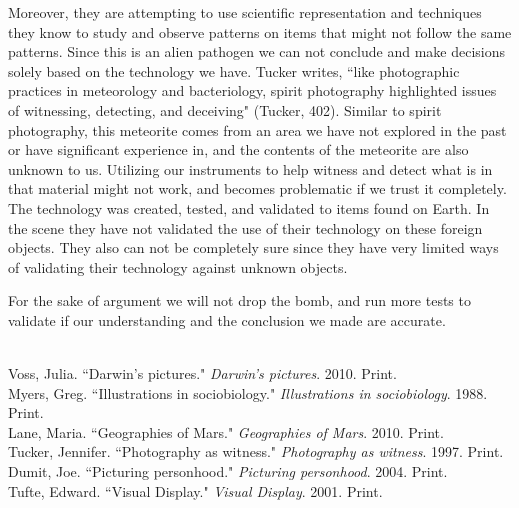 \documentclass[11pt, oneside]{article}
\begin{document}

\par Moreover, they are attempting to use scientific representation and techniques they know to study and observe patterns on items that might not follow the same patterns. Since this is an alien pathogen we can not conclude and make decisions solely based on the technology we have. Tucker writes, ``like photographic practices in meteorology and bacteriology, spirit photography highlighted issues of witnessing, detecting, and deceiving" (Tucker, 402). Similar to spirit photography, this meteorite comes from an area we have not explored in the past or have significant experience in, and the contents of the meteorite are also unknown to us. Utilizing our instruments to help witness and detect what is in that material might not work, and becomes problematic if we trust it completely. The technology was created, tested, and validated to items found on Earth. In the scene they have not validated the use of their technology on these foreign objects. They also can not be completely sure since they have very limited ways of validating their technology against unknown objects.


\par For the sake of argument we will not drop the bomb, and run more tests to validate if our understanding and the conclusion we made are accurate. 

\begin{workscited}
\bibent \\
\bibent Voss, Julia. ``Darwin's pictures."  \textit{Darwin's pictures}.  2010. Print. \\
\bibent Myers, Greg. ``Illustrations in sociobiology."  \textit{Illustrations in sociobiology}.  1988. Print. \\
\bibent Lane, Maria. ``Geographies of Mars."  \textit{Geographies of Mars}.  2010. Print. \\
\bibent Tucker, Jennifer. ``Photography as witness."  \textit{Photography as witness}.  1997. Print. \\
\bibent Dumit, Joe. ``Picturing personhood."  \textit{Picturing personhood}.  2004. Print. \\
\bibent Tufte, Edward. ``Visual Display."  \textit{Visual Display}.  2001. Print. \\
\end{workscited}
\end{document}
